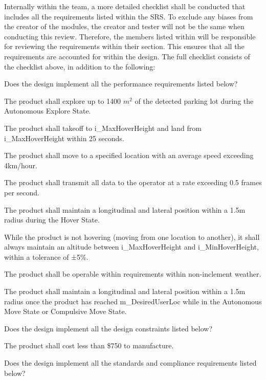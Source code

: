 \documentclass[12pt, titlepage]{article}
\begin{document}
Internally within the team, a more detailed checklist shall be conducted that includes all the requirements listed within the SRS. To exclude any biases from the creator of the modules, the creator and tester will not be the same when conducting this review. Therefore, the members listed within \label{VnV_Team} will be responsible for reviewing the requirements within their section. This ensures that all the requirements are accounted for within the design. The full checklist consists of the checklist above, in addition to the following: 

\begin{todolist}
\label{Design2_Checklist}
\item Does the design implement all the performance requirements listed below?
\begin{todolist}
    \item The product shall explore up to 1400 $m^2$ of the detected parking lot during the Autonomous Explore State.
    \item The product shall takeoff to i\_MaxHoverHeight and land from i\_MaxHoverHeight within 25 seconds.
    \item The product shall move to a specified location with an average speed exceeding 4km/hour.
    \item The product shall transmit all data to the operator at a rate exceeding 0.5 frames per second.
    \item The product shall maintain a longitudinal and lateral position within a 1.5m radius during the Hover State.
    \item While the product is not hovering (moving from one location to another), it shall always maintain an altitude between i\_MaxHoverHeight and i\_MinHoverHeight, within a tolerance of ±5\%.
    \item The product shall be operable within requirements within non-inclement weather.
    \item The product shall maintain a longitudinal and lateral position within a 1.5m radius once the product has reached m\_DesiredUserLoc while in the Autonomous Move State or Compulsive Move State.
\end{todolist}
\item Does the design implement all the design constraints listed below?
\begin{todolist}
    \item The product shall cost less than \$750 to manufacture.
\end{todolist}
\item Does the design implement all the standards and compliance requirements listed below?

\end{todolist}
\end{document}
